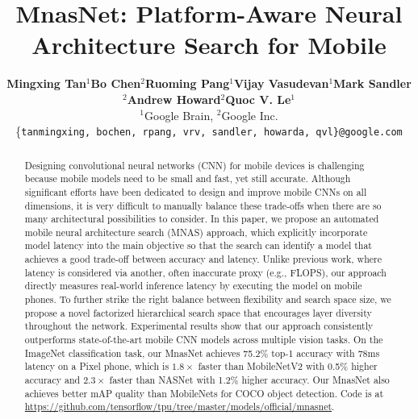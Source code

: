 \documentclass[10pt,twocolumn,letterpaper]{article}
\begin{document}
%
\title{MnasNet: Platform-Aware Neural Architecture Search for Mobile}

\author{
	\small
	\begin{tabular}{c c c c c c c }                                                          
		\bf Mingxing Tan$^1$ &
		\bf Bo Chen$^2$ &
		\bf Ruoming Pang$^1$ &
		\bf Vijay Vasudevan$^1$ &
		\bf Mark Sandler$^2$ &
		\bf Andrew Howard$^2$ &
		\bf Quoc V. Le$^1$ \\                                        
		\multicolumn{7}{c}{$^1$Google Brain, $^2$Google Inc.} \\                                                  
		\multicolumn{7}{c}{\{\tt\small tanmingxing, bochen, rpang, vrv, sandler, howarda, qvl\}@google.com} \\
	\end{tabular}                                                                       
}   

\maketitle
\thispagestyle{empty}
	
%
\def\TODO{\textcolor{red}{\emph{TODO: }}}
\newcommand{\TT}[1]{\emph{#1}}
\newcommand{\BF}[1]{\textbf{#1}}
\newcommand{\IT}[1]{\textit{#1}}

\newcommand\blfootnote[1]{%
	\begingroup
	\renewcommand\thefootnote{}\footnote{#1}%
	\addtocounter{footnote}{-1}%
	\endgroup
} 
%
\begin{abstract}
Designing convolutional neural networks (CNN)  for mobile devices is challenging because mobile models need to be small and fast, yet still accurate. Although significant efforts have been dedicated to design and improve mobile CNNs on all dimensions, it is very difficult to manually balance these trade-offs when there are so many architectural possibilities to consider. In this paper, we propose an  automated  mobile neural architecture search (MNAS) approach, which explicitly incorporate model latency  into the main objective so that the search can identify a model that achieves a good trade-off between accuracy and latency. Unlike previous work, where latency is considered via another, often inaccurate proxy (e.g., FLOPS), our approach directly measures real-world inference latency by executing the model on mobile phones.
To further strike the right balance between flexibility and search space size, we propose a novel factorized hierarchical search space that encourages layer diversity throughout the network. Experimental results show that our approach consistently outperforms state-of-the-art mobile CNN models across multiple vision tasks. On the ImageNet classification task, our MnasNet achieves 75.2\% top-1 accuracy with 78ms latency on a Pixel phone, which is $1.8\times$ faster than MobileNetV2 \cite{mobilenetv218} with 0.5\% higher accuracy and $2.3\times$ faster than NASNet \cite{nas_imagenet18} with 1.2\% higher accuracy. Our MnasNet also achieves better mAP quality than MobileNets for COCO object detection. Code is at \url{https://github.com/tensorflow/tpu/tree/master/models/official/mnasnet}.
\end{abstract}
\end{document}
